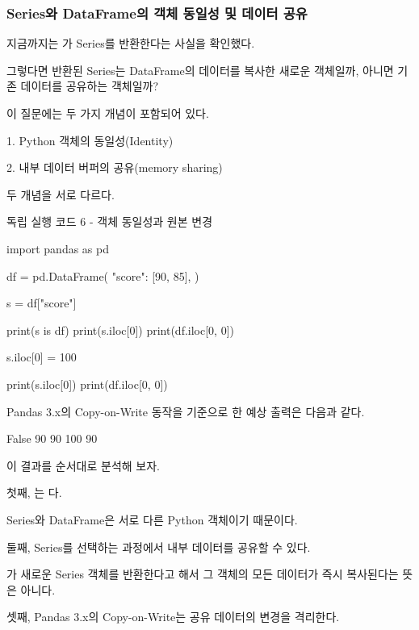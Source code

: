 \subsubsection{Series와 DataFrame의 객체 동일성 및 데이터 공유}

지금까지는 가 Series를 반환한다는 사실을 확인했다.

그렇다면 반환된 Series는 DataFrame의 데이터를 복사한 새로운 객체일까, 아니면 기존 데이터를 공유하는 객체일까?

이 질문에는 두 가지 개념이 포함되어 있다.

\begin{dhksmry}
    1. Python 객체의 동일성(Identity)

    2. 내부 데이터 버퍼의 공유(memory sharing)
\end{dhksmry}

두 개념을 서로 다르다.

\begin{dhknote}
\begin{dhksmry}[centered]
독립 실행 코드 6 - 객체 동일성과 원본 변경
\end{dhksmry}
\end{dhknote}

\begin{dhkcode}
import pandas as pd

df = pd.DataFrame({
    "score": [90, 85],
})

s = df["score"]

print(s is df)
print(s.iloc[0])
print(df.iloc[0, 0])

s.iloc[0] = 100

print(s.iloc[0])
print(df.iloc[0, 0])
\end{dhkcode}

Pandas 3.x의 Copy-on-Write 동작을 기준으로 한 예상 출력은 다음과 같다.

\begin{dhkzsh}
False
90
90
100
90
\end{dhkzsh}

이 결과를 순서대로 분석해 보자.

첫째, 는 다.

Series와 DataFrame은 서로 다른 Python 객체이기 때문이다.

둘째, Series를 선택하는 과정에서 내부 데이터를 공유할 수 있다.

가 새로운 Series 객체를 반환한다고 해서 그 객체의 모든 데이터가 즉시 복사된다는 뜻은 아니다.

셋째, Pandas 3.x의 Copy-on-Write는 공유 데이터의 변경을 격리한다.

